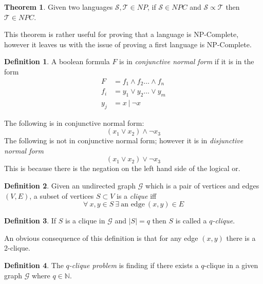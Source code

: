 \documentclass{article}
\theoremstyle{definition}
\newtheorem{definition}{Definition}[section]
\newtheorem{theorem}{Theorem}[section]
\begin{document}
\begin{theorem}
	Given two languages $\mathcal{S}, \mathcal{T} \in NP$,
	if $\mathcal{S} \in NPC$ and $\mathcal{S} \propto \mathcal{T}$ then
	$\mathcal{T} \in NPC$.
\end{theorem}

This theorem is rather useful for proving that a language is NP-Complete,
however it leaves us with the issue of proving a first language is NP-Complete.

\begin{definition}
	A boolean formula $F$ is in \textit{conjunctive normal form} if it is in the form
	\begin{equation}
	\begin{split}
		F &= f_1 \land f_2 \dots \land f_n \\
		f_i &= y_1 \lor y_2 \dots \lor y_m \\
		y_j &= x\ |\ \neg x
	\end{split}
	\end{equation}
\end{definition}

The following is in conjunctive normal form:
$$(x_1 \lor x_2) \land \neg x_3$$
The following is not in conjunctive normal form;
however it is in \textit{disjunctive normal form}
$$(x_1 \lor x_2) \lor \neg x_3$$
This is because there is the negation on the left hand side of the logical or.

\begin{definition}
	Given an undirected graph $\mathcal{G}$ which is a pair of vertices and edges $(V,E)$,
	a subset of vertices $S \subset V$ is a \textit{clique} iff
	$$\forall\ x, y \in S\ \exists\ \textrm{an edge}\ (x,y) \in E$$
\end{definition}

\begin{definition}
	If $S$ is a clique in $\mathcal{G}$ and $|S| = q$ then $S$ is called a \textit{$q$-clique}.
\end{definition}

An obvious consequence of this definition is that for any edge $(x,y)$ there is a 2-clique.

\begin{definition}
	The \textit{$q$-clique problem} is finding if there exists a $q$-clique in a given graph
	$\mathcal{G}$ where $q \in \mathbb{N}$.
\end{definition}
\end{document}
